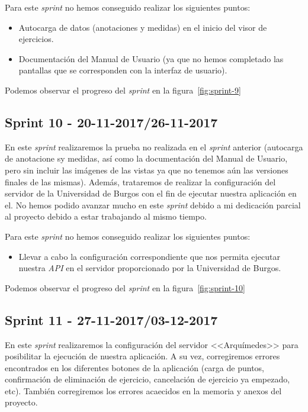 Para este \textit{sprint} no hemos conseguido realizar  los siguientes puntos:
\begin{itemize}
	\item Autocarga de datos (anotaciones y medidas) en el inicio del visor de ejercicios.
	\item Documentación del Manual de Usuario (ya que no hemos completado las pantallas que se corresponden con la interfaz de usuario).
\end{itemize}

Podemos observar el progreso del \textit{sprint} en la figura~\ref{fig:sprint-9}

\subsection{Sprint 10 - 20-11-2017/26-11-2017}
En este \textit{sprint} realizaremos la prueba no realizada en el \textit{sprint} anterior (autocarga de anotacione sy medidas, así como la documentación del Manual de Usuario, pero sin incluir las imágenes de las vistas ya que no tenemos aún las versiones finales de las mismas). Además, trataremos de realizar la configuración del servidor de la Universidad de Burgos con el fin de ejecutar nuestra aplicación en el. No hemos podido avanzar mucho en este \textit{sprint} debido a mi dedicación parcial al proyecto debido a estar trabajando al mismo tiempo.

Para este \textit{sprint} no hemos conseguido realizar  los siguientes puntos:
\begin{itemize}
	\item Llevar a cabo la configuración correspondiente que nos permita ejecutar nuestra \textit{API} en el servidor proporcionado por la Universidad de Burgos.
\end{itemize}

Podemos observar el progreso del \textit{sprint} en la figura~\ref{fig:sprint-10}

\subsection{Sprint 11 - 27-11-2017/03-12-2017}
En este \textit{sprint} realizaremos la configuración del servidor <<Arquímedes>> para posibilitar la ejecución de nuestra aplicación. A su vez, corregiremos errores encontrados en los diferentes botones de la aplicación (carga de puntos, confirmación de eliminación de ejercicio, cancelación de ejercicio ya empezado, etc). También corregiremos los errores acaecidos en la memoria y anexos del proyecto.

